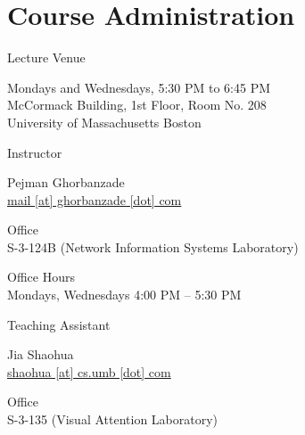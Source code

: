 \documentclass[compress]{beamer}
\begin{document}
\prepareCover

\section{Course Administration}

\begin{slide}
	\begin{block}{Lecture Venue}

	Mondays and Wednesdays, 5:30 PM to 6:45 PM\\
	McCormack Building, 1st Floor, Room No. 208\\
	University of Massachusetts Boston

	\end{block}
\end{slide}

\begin{slide}
	\begin{block}{Instructor}

	Pejman Ghorbanzade\\
	\href{mailto:mail@ghorbanzade.com}{mail [at] ghorbanzade [dot] com}

	\par
	\vspace{0.5em}
	{\large Office}\\S-3-124B (Network Information Systems Laboratory)

	\par
	\vspace{0.5em}
	{\large Office Hours}\\Mondays, Wednesdays 4:00 PM -- 5:30 PM

	\end{block}
\end{slide}

\begin{slide}
	\begin{block}{Teaching Assistant}

	Jia Shaohua\\
	\href{mailto:shaohua@cs.umb.edu}{shaohua [at] cs.umb [dot] com}

	\par
	\vspace{0.5em}
	{\large{Office}\\S-3-135 (Visual Attention Laboratory)}

	\end{block}
\end{slide}
\end{document}
